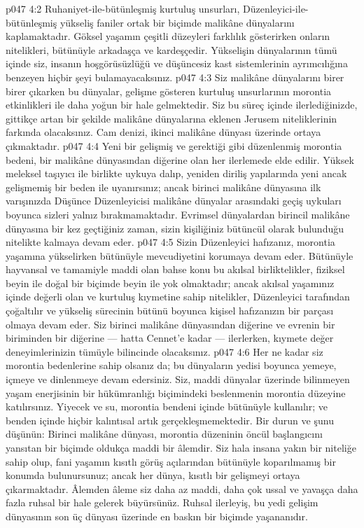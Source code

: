 \vs p047 4:2 Ruhaniyet\hyp{}ile\hyp{}bütünleşmiş kurtuluş unsurları, Düzenleyici\hyp{}ile\hyp{}bütünleşmiş yükseliş faniler ortak bir biçimde malikâne dünyalarını kaplamaktadır. Göksel yaşamın çeşitli düzeyleri farklılık gösterirken onların nitelikleri, bütünüyle arkadaşça ve kardeşçedir. Yükselişin dünyalarının tümü içinde siz, insanın hoşgörüsüzlüğü ve düşüncesiz kast sistemlerinin ayrımcılığına benzeyen hiçbir şeyi bulamayacaksınız.
\vs p047 4:3 Siz malikâne dünyalarını birer birer çıkarken bu dünyalar, gelişme gösteren kurtuluş unsurlarının morontia etkinlikleri ile daha yoğun bir hale gelmektedir. Siz bu süreç içinde ilerlediğinizde, gittikçe artan bir şekilde malikâne dünyalarına eklenen Jerusem niteliklerinin farkında olacaksınız. Cam denizi, ikinci malikâne dünyası üzerinde ortaya çıkmaktadır.
\vs p047 4:4 Yeni bir gelişmiş ve gerektiği gibi düzenlenmiş morontia bedeni, bir malikâne dünyasından diğerine olan her ilerlemede elde edilir. Yüksek meleksel taşıyıcı ile birlikte uykuya dalıp, yeniden diriliş yapılarında yeni ancak gelişmemiş bir beden ile uyanırsınız; ancak birinci malikâne dünyasına ilk varışınızda Düşünce Düzenleyicisi malikâne dünyalar arasındaki geçiş uykuları boyunca sizleri yalnız bırakmamaktadır. Evrimsel dünyalardan birincil malikâne dünyasına bir kez geçtiğiniz zaman, sizin kişiliğiniz bütüncül olarak bulunduğu nitelikte kalmaya devam eder.
\vs p047 4:5 Sizin Düzenleyici hafızanız, morontia yaşamına yükselirken bütünüyle mevcudiyetini korumaya devam eder. Bütünüyle hayvansal ve tamamiyle maddi olan bahse konu bu akılsal birliktelikler, fiziksel beyin ile doğal bir biçimde beyin ile yok olmaktadır; ancak akılsal yaşamınız içinde değerli olan ve kurtuluş kıymetine sahip nitelikler, Düzenleyici tarafından çoğaltılır ve yükseliş sürecinin bütünü boyunca kişisel hafızanızın bir parçası olmaya devam eder. Siz birinci malikâne dünyasından diğerine ve evrenin bir biriminden bir diğerine --- hatta Cennet’e kadar --- ilerlerken, kıymete değer deneyimlerinizin tümüyle bilincinde olacaksınız.
\vs p047 4:6 Her ne kadar siz morontia bedenlerine sahip olsanız da; bu dünyaların yedisi boyunca yemeye, içmeye ve dinlenmeye devam edersiniz. Siz, maddi dünyalar üzerinde bilinmeyen yaşam enerjisinin bir hükümranlığı biçimindeki beslenmenin morontia düzeyine katılırsınız. Yiyecek ve su, morontia bendeni içinde bütünüyle kullanılır; ve benden içinde hiçbir kalıntısal artık gerçekleşmemektedir. Bir durun ve şunu düşünün: Birinci malikâne dünyası, morontia düzeninin öncül başlangıcını yansıtan bir biçimde oldukça maddi bir âlemdir. Siz hala insana yakın bir niteliğe sahip olup, fani yaşamın kısıtlı görüş açılarından bütünüyle koparılmamış bir konumda bulunursunuz; ancak her dünya, kısıtlı bir gelişmeyi ortaya çıkarmaktadır. Âlemden âleme siz daha az maddi, daha çok ussal ve yavaşça daha fazla ruhsal bir hale gelerek büyürsünüz. Ruhsal ilerleyiş, bu yedi gelişim dünyasının son üç dünyası üzerinde en baskın bir biçimde yaşananıdır.
